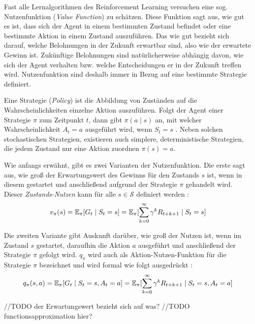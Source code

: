 Fast alle Lernalgorithmen des Reinforcement Learning versuchen eine sog. Nutzenfunktion (\textit{Value Function}) zu schätzen. Diese Funktion sagt aus, \glqq wie gut\grqq{} es ist, dass sich der Agent in einem bestimmten Zustand befindet oder eine bestimmte Aktion in einem Zustand auszuführen. Das \glqq wie gut\grqq{}  bezieht sich darauf,
welche Belohnungen in der Zukunft erwartbar sind, also wie der erwartete Gewinn ist. Zukünftige Belohnungen sind natürlicherweise abhängig davon, wie sich der Agent verhalten bzw. welche Entscheidungen er in der Zukunft treffen wird. Nutzenfunktion sind deshalb immer in Bezug auf eine bestimmte Strategie definiert\cite[S.~58]{Sutton1998}.
\par 
Eine Strategie (\textit{Policy}) ist die Abbildung von Zuständen auf die Wahrscheinlichkeiten einzelne Aktion auszuführen. Folgt der Agent einer Strategie $\pi$ zum Zeitpunkt $t$, dann gibt $\pi(a\mid s)$ an, mit welcher Wahrscheinlichkeit $A_t = a$ ausgeführt wird, wenn $S_t = s$ \cite[S.~58]{Sutton1998}. Neben solchen stochastischen Strategien, existieren auch simplere, deterministische Strategien, die jedem Zustand nur eine Aktion zuordnen $\pi (s) = a$. 
\par
Wie anfangs erwähnt, gibt es zwei Varianten der Nutzenfunktion. Die erste sagt aus, wie groß der Erwartungswert des Gewinns für den Zustands $s$ ist, wenn in diesem gestartet und anschließend aufgrund der Strategie $\pi$ gehandelt wird. Dieser \textit{Zustands-Nutzen} kann für alle $s \in \mathcal{S}$ definiert werden \cite[S.~58]{Sutton1998}:
\begin{equation}\label{eq:valueFunction}
    v_\pi(s) = \operatorname{\mathbb{E}}_\pi[G_t \mid S_t = s] = \operatorname{\mathbb{E}}_\pi[\sum_{k=0}^\infty{\gamma^k R_{t+k+1} \mid S_t = s}]
\end{equation}

Die zweiten Variante gibt Auskunft darüber, wie groß der Nutzen ist, wenn im Zustand $s$ gestartet, daraufhin die Aktion $a$ ausgeführt und anschließend der Strategie $\pi$ gefolgt wird. $q_\pi$ wird auch als Aktion-Nutzen-Funktion für die Strategie $\pi$ bezeichnet und wird formal wie folgt ausgedrückt \cite[S.~58]{Sutton1998}:
\begin{equation}\label{eq:actionValueFunction}
    q_\pi(s,a) = \operatorname{\mathbb{E}}_\pi[G_t \mid S_t = s, A_t = a] = \operatorname{\mathbb{E}}_\pi[\sum_{k=0}^\infty{\gamma^k R_{t+k+1} \mid S_t = s, A_t = a}]
\end{equation}

//TODO der Erwartungswert bezieht sich auf was?
//TODO functionsapproximation hier? 